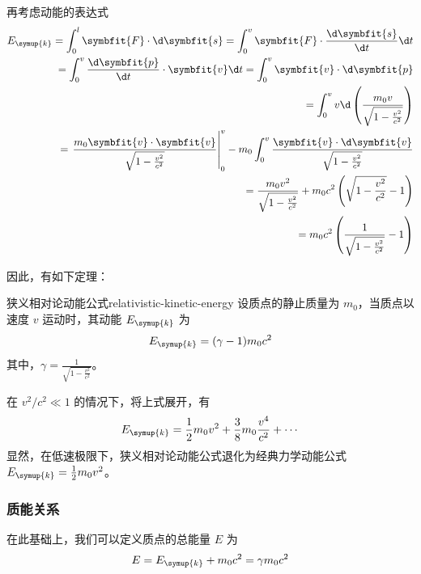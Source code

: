 再考虑动能的表达式
\begin{equation}
    \begin{aligned}
        E_{\symup{k}} = \int_{0}^{l} \symbfit{F} \cdot \d \symbfit{s} = \int_{0}^{v} \symbfit{F} \cdot \frac{\d \symbfit{s}}{\d t} \d t \\
        = \int_{0}^{v} \frac{\d \symbfit{p}}{\d t} \cdot \symbfit{v} \d t = \int_{0}^{v} \symbfit{v} \cdot \d \symbfit{p}               \\
        = \int_{0}^{v} v \d \left(\frac{m_0 v}{\sqrt{1 - \frac{v^2}{c^2}}}\right)                                                       \\
        = \left. \frac{m_0 \symbfit{v} \cdot \symbfit{v}}{\sqrt{1 - \frac{v^2}{c^2}}} \right|_{0}^{v} -
        m_0 \int_{0}^{v} \frac{\symbfit{v} \cdot \d \symbfit{v}}{\sqrt{1 - \frac{v^2}{c^2}}}                                            \\
        = \frac{m_0 v^2}{\sqrt{1 - \frac{v^2}{c^2}}} + m_0 c^2 \left(\sqrt{1 - \frac{v^2}{c^2}} - 1\right)                              \\
        = m_0 c^2 \left(\frac{1}{\sqrt{1 - \frac{v^2}{c^2}}} - 1\right)
    \end{aligned}
\end{equation}

因此，有如下定理：
\begin{theorem}{狭义相对论动能公式}{relativistic-kinetic-energy}
    设质点的静止质量为 $m_0$，当质点以速度 $v$ 运动时，其动能 $E_{\symup{k}}$ 为
    \begin{equation}
        E_{\symup{k}} = (\gamma - 1) m_0 c^2
    \end{equation}
    其中，$\gamma = \frac{1}{\sqrt{1 - \frac{v^2}{c^2}}}$。
\end{theorem}

在 $v^2 / c^2 \ll 1$ 的情况下，将上式展开，有
\begin{equation}
    E_{\symup{k}} = \frac{1}{2} m_0 v^2 + \frac{3}{8} m_0 \frac{v^4}{c^2} + \cdots
\end{equation}
显然，在低速极限下，狭义相对论动能公式退化为经典力学动能公式 $E_{\symup{k}} = \frac{1}{2} m_0 v^2$。

\subsubsection{质能关系}

在此基础上，我们可以定义质点的总能量 $E$ 为
\begin{equation}
    E = E_{\symup{k}} + m_0 c^2 = \gamma m_0 c^2
\end{equation}

